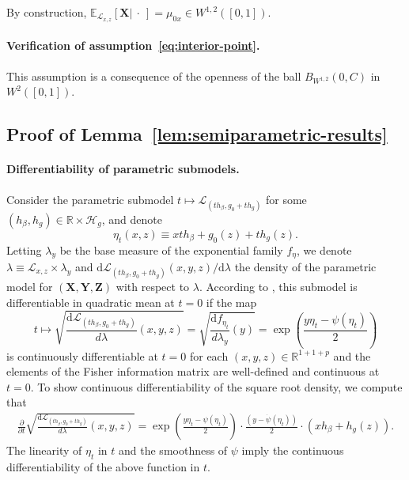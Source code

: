 \documentclass[12pt]{article}
\theoremstyle{definition}
\theoremstyle{remark}
\newcommand{\E}{\mathbb E}								%
\newcommand{\R}{\mathbb{R}}								%
\newcommand{\prx}{\bm X}								%
\newcommand{\prz}{\bm Z}								%
\newcommand{\pry}{{\bm Y}}								%
\newcommand{\law}{\mathcal L}							%
\renewcommand{\H}{\mathcal H}		 					%
\begin{document}
By construction, $\E_{\law_{x,z}}[\prx |\ \cdot\ ] = \mu_{0x} \in W^{1,2}([0,1])$.

\paragraph{Verification of assumption~\eqref{eq:interior-point}.} This assumption is a consequence of the openness of the ball $B_{W^{1,2}}(0, C)$ in $W^2([0,1])$.

\subsection{Proof of Lemma~\ref{lem:semiparametric-results}} \label{sec:proof-of-lemma-9}

\paragraph{Differentiability of parametric submodels.}

Consider the parametric submodel $t \mapsto \law_{(th_\beta, g_0 + th_g)}$ for some $(h_\beta, h_g) \in \R \times \H_g$, and denote 
\begin{equation*}
\eta_t(x, z) \equiv x th_\beta+g_0(z)+th_g(z). 
\end{equation*}
Letting $\lambda_{y}$ be the base measure of the exponential family $f_\eta$, we denote $\lambda \equiv \law_{x,z} \times \lambda_{y}$ and $\mathrm d \law_{(th_\beta, g_0 + th_g)}(x, y, z)/\mathrm d \lambda$ the density of the parametric model for $(\prx, \pry, \prz)$ with respect to $\lambda$. According to \citet[Lemma 7.6]{VDV1998}, this submodel is differentiable in quadratic mean at $t = 0$ if the map 
\begin{equation*}
t \mapsto \sqrt{\frac{\mathrm d \law_{(th_\beta, g_0 + th_g)}}{d\lambda}(x, y, z)} = \sqrt{\frac{\mathrm df_{\eta_t}}{d\lambda_y}(y)} = \exp\left(\frac{y\eta_t-\psi(\eta_t)}{2}\right)
\end{equation*}
is continuously differentiable at $t = 0$ for each $(x,  y, z) \in \R^{1 + 1 + p}$ and the elements of the Fisher information matrix are well-defined and continuous at $t = 0$. To show continuous differentiability of the square root density, we compute that
\begin{align*}
	\frac{\partial}{\partial t}\sqrt{\frac{\mathrm d \law_{(th_\beta, g_0 + th_g)}}{d\lambda}(x, y, z)} = \exp\left(\frac{y\eta_t-\psi(\eta_t)}{2}\right)\cdot\frac{(y-\dot{\psi}(\eta_t))}{2}\cdot (xh_\beta + h_g(z)).
\end{align*}
The linearity of $\eta_t$ in $t$ and the smoothness of $\psi$ imply the continuous differentiability of the above function in $t$.
\end{document}

